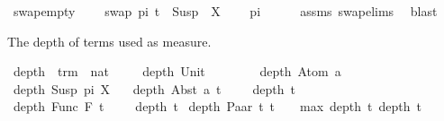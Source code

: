 \begin{isabellebody}
%
\isadelimproof
\isanewline
%
\endisadelimproof
\isanewline
{}\isamarkupfalse%
\ swap{\isacharunderscore}{\kern0pt}empty{\isacharcolon}{\kern0pt}\ \isanewline
\ \ \ {\isachardoublequoteopen}swap\ pi\ t\ {\isacharequal}{\kern0pt}\ Susp\ {\isacharbrackleft}{\kern0pt}{\isacharbrackright}{\kern0pt}\ X{\isachardoublequoteclose}\ \isanewline
\ \ \ {\isachardoublequoteopen}pi\ {\isacharequal}{\kern0pt}\ {\isacharbrackleft}{\kern0pt}{\isacharbrackright}{\kern0pt}{\isachardoublequoteclose}\isanewline
%
\isadelimproof
\ \ %
\endisadelimproof
%
\isatagproof
{}\isamarkupfalse%
\ assms\ swap{\isachardot}{\kern0pt}elims\ \isamarkupfalse%
\ blast%
\endisatagproof
{\isafoldproof}%
%
\isadelimproof
%
\endisadelimproof
%
\begin{isamarkuptext}%
The depth of terms used as measure.%
\end{isamarkuptext}\isamarkuptrue%
\isamarkupfalse%
\ depth\ {\isacharcolon}{\kern0pt}{\isacharcolon}{\kern0pt}\ {\isachardoublequoteopen}trm\ {\isasymRightarrow}\ nat{\isachardoublequoteclose}\isanewline
\ \ \isanewline
\ \ {\isachardoublequoteopen}depth\ {\isacharparenleft}{\kern0pt}Unit{\isacharparenright}{\kern0pt}\ \ \ \ \ \ {\isacharequal}{\kern0pt}\ {}{\isachardoublequoteclose}\isanewline
{\isacharbar}{\kern0pt}\ {\isachardoublequoteopen}depth\ {\isacharparenleft}{\kern0pt}Atom\ a{\isacharparenright}{\kern0pt}\ \ \ \ {\isacharequal}{\kern0pt}\ {}{\isachardoublequoteclose}\isanewline
{\isacharbar}{\kern0pt}\ {\isachardoublequoteopen}depth\ {\isacharparenleft}{\kern0pt}Susp\ pi\ X{\isacharparenright}{\kern0pt}\ {\isacharequal}{\kern0pt}\ {}{\isachardoublequoteclose}\isanewline
{\isacharbar}{\kern0pt}\ {\isachardoublequoteopen}depth\ {\isacharparenleft}{\kern0pt}Abst\ a\ t{\isacharparenright}{\kern0pt}\ \ {\isacharequal}{\kern0pt}\ {}\ {\isacharplus}{\kern0pt}\ depth\ t{\isachardoublequoteclose}\isanewline
{\isacharbar}{\kern0pt}\ {\isachardoublequoteopen}depth\ {\isacharparenleft}{\kern0pt}Func\ F\ t{\isacharparenright}{\kern0pt}\ \ {\isacharequal}{\kern0pt}\ {}\ {\isacharplus}{\kern0pt}\ depth\ t{\isachardoublequoteclose}\isanewline
{\isacharbar}{\kern0pt}\ {\isachardoublequoteopen}depth\ {\isacharparenleft}{\kern0pt}Paar\ t\ t{\isacharprime}{\kern0pt}{\isacharparenright}{\kern0pt}\ {\isacharequal}{\kern0pt}\ {}\ {\isacharplus}{\kern0pt}\ {\isacharparenleft}{\kern0pt}max\ {\isacharparenleft}{\kern0pt}depth\ t{\isacharparenright}{\kern0pt}\ {\isacharparenleft}{\kern0pt}depth\ t{\isacharprime}{\kern0pt}{\isacharparenright}{\kern0pt}{\isacharparenright}{\kern0pt}{\isachardoublequoteclose}\ \isanewline

\end{isabellebody}
